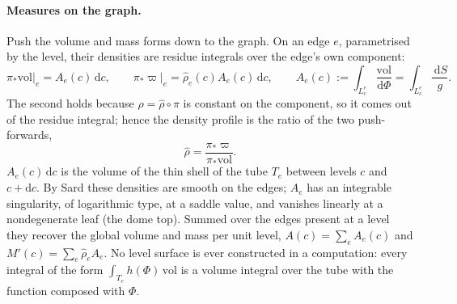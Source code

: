 \documentclass[11pt]{article}
\theoremstyle{definition}
\theoremstyle{remark}
\newcommand{\dS}{\,\mathrm{d}S}
\newcommand{\dc}{\,\mathrm{d}c}
\newcommand{\vol}{\mathrm{vol}}
\begin{document}
\paragraph{Measures on the graph.} Push the volume and mass forms down
to the graph. On an edge $e$, parametrised by the level, their
densities are residue integrals over the edge's own component:
\begin{equation}
  \pi_*\vol\big|_e = A_e(c)\dc,\qquad
  \pi_*\varpi\big|_e = \hat\rho_e(c)A_e(c)\dc,\qquad
  A_e(c) := \int_{L^e_c}\frac{\vol}{\mathrm d\Phi} = \int_{L^e_c}\frac{\dS}{g} .
  \label{eq:graphmeasures}
\end{equation}
The second holds because $\rho = \hat\rho\circ\pi$ is constant on the
component, so it comes out of the residue integral; hence the density
profile is the ratio of the two push-forwards,
\begin{equation}
  \hat\rho = \frac{\pi_*\varpi}{\pi_*\vol} .
  \label{eq:Mprime}
\end{equation}
$A_e(c)\dc$ is the volume of the thin shell of the tube $T_e$ between
levels $c$ and $c + \mathrm dc$. By Sard these densities are smooth on
the edges; $A_e$ has an integrable singularity, of logarithmic type,
at a saddle value, and vanishes linearly at a nondegenerate leaf (the
dome top). Summed over the edges present at a level they recover the
global volume and mass per unit level, $A(c) = \sum_eA_e(c)$ and
$M'(c) = \sum_e\hat\rho_eA_e$. No level surface is ever constructed in
a computation: every integral of the form $\int_{T_e}h(\Phi)\,\vol$ is
a volume integral over the tube with the function composed with
$\Phi$.
\end{document}
